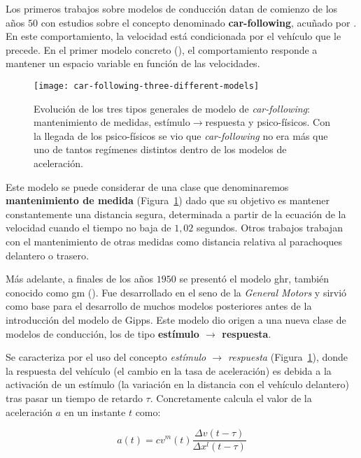 Los primeros trabajos sobre modelos de conducción datan de comienzo de los años $50$ con estudios sobre el concepto denominado \textbf{\gls{car-following}}, acuñado por \cite{reuschel1950fahrzeugbewegungen}. En este comportamiento, la velocidad está condicionada por el vehículo que le precede. En el primer modelo concreto (\cite{Pipes1953}), el comportamiento responde a mantener un espacio variable en función de las velocidades.

\begin{figure}
	\centering
	\texttt{[image: car-following-three-different-models]}
	\caption[Evolución de los tres tipos generales de modelo de \textit{car-following}]{Evolución de los tres tipos generales de modelo de \textit{\gls{car-following}}: mantenimiento de medidas, estímulo$\rightarrow$respuesta y psico-físicos. Con la llegada de los psico-físicos se vio que \textit{\gls{car-following}} no era más que uno de tantos regímenes distintos dentro de los modelos de aceleración.}
	\label{fig:car-following-three-different-models}
\end{figure}

Este modelo se puede considerar de una clase que denominaremos \textbf{mantenimiento de medida} (Figura~\ref{fig:car-following-three-different-models}) dado que su objetivo es mantener constantemente una distancia segura, determinada a partir de la ecuación de la velocidad cuando el tiempo no baja de $1,02$ segundos. Otros trabajos trabajan con el mantenimiento de otras medidas como distancia relativa al parachoques delantero o trasero.

Más adelante, a finales de los años $1950$ se presentó el modelo \Acrfull{ghr}, también conocido como \Acrfull{gm} (\cite{Chandler1958}). Fue desarrollado en el seno de la \textit{General Motors} y sirvió como base para el desarrollo de muchos modelos posteriores antes de la introducción del modelo de Gipps. Este modelo dio origen a una nueva clase de modelos de conducción, los de tipo \textbf{estímulo $\rightarrow$ respuesta}. 

Se caracteriza por el uso del concepto \textit{estímulo $\rightarrow$ respuesta} (Figura~\ref{fig:car-following-three-different-models}), donde la respuesta del vehículo (el cambio en la tasa de aceleración) es debida a la activación de un estímulo (la variación en la distancia con el vehículo delantero) tras pasar un tiempo de retardo $\tau$. Concretamente calcula el valor de la aceleración $a$ en un instante $t$ como:
	
\begin{equation}
	a(t) = c v^m(t) \frac{\Delta v(t - \tau)}{\Delta x^l(t - \tau)}
	\label{eq:ghr-car-following-model}
\end{equation}
	
